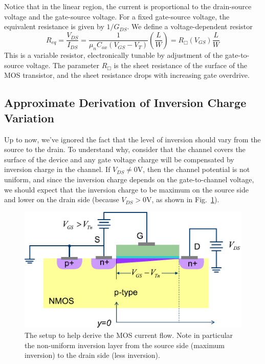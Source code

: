 Notice that in the linear region, the current is proportional to the drain-source voltage and the gate-source voltage.  For a fixed gate-source voltage, the equivalent resistance is given by $1/G_{DS}$.  We define a voltage-dependent resistor
%
\begin{equation}
	{R_{eq}} = \frac{{{V_{DS}}}}{{{I_{DS}}}} = \frac{1}{{{\mu _n}{C_{ox}}({V_{GS}} - {V_T})}}\left( {\frac{L}{W}} \right) = {R_\Box}({V_{GS}})\frac{L}{W}
\end{equation}
This is a variable resistor, electronically tunable by adjustment of the gate-to-source voltage.  The parameter $R_\Box$ is the sheet resistance of the surface of the MOS transistor, and the sheet resistance drops with increasing gate overdrive.
 



\subsection{Approximate Derivation of Inversion Charge Variation}

Up to now, we've ignored the fact that the level of inversion should vary from the source to the drain.  To understand why, consider that the channel covers the surface of the device and any gate voltage charge will be compensated by inversion charge in the channel.  If $V_{DS} \ne 0$V, then the channel potential is not uniform, and since the inversion charge depends on the gate-to-channel voltage, we should expect that the inversion charge to be maximum on the source side and lower on the drain side (because $V_{DS} > 0$V, as shown in Fig.~\ref{fig:mos_current_derive}).


\begin{figure}[tb]
\begin{center}
\includegraphics[width=.75\columnwidth]{mos_current_derive}
\end{center}
\caption{The setup to help derive the MOS current flow.  Note in particular the non-uniform inversion layer from the source side (maximum inversion) to the drain side (less inversion).} \label{fig:mos_current_derive}
\end{figure}

